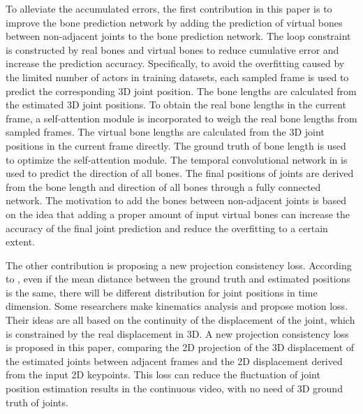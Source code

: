 \documentclass[journal]{IEEEtran}
\begin{document}
To alleviate the accumulated errors, the first contribution in this paper is to improve the bone prediction network by adding the prediction of virtual bones between non-adjacent joints to the bone prediction network. The loop constraint is constructed by real bones and virtual bones to reduce cumulative error and increase the prediction accuracy. Specifically, to avoid the overfitting caused by the limited number of actors in training datasets, each sampled frame is used to predict the corresponding 3D joint position. The bone lengths are calculated from the estimated 3D joint positions. To obtain the real bone lengths in the current frame, a self-attention module is incorporated to weigh the real bone lengths from sampled frames. The virtual bone lengths are calculated from the 3D joint positions in the current frame directly. The ground truth of bone length is used to optimize the self-attention module. The temporal convolutional network in \cite{20183D} is used to predict the direction of all bones. The final positions of joints are derived from the bone length and direction of all bones through a fully connected network. The motivation to add the bones between non-adjacent joints is based on the idea that adding a proper amount of input virtual bones can increase the accuracy of the final joint prediction and reduce the overfitting to a certain extent.



The other contribution is proposing a new projection consistency loss. According to  \cite{wang2020motion}, even if the  mean distance between the ground truth and estimated positions is the same, there will be different distribution for joint positions in time dimension. Some researchers \cite{2020Deep,wang2020motion} make kinematics analysis and propose motion loss. Their ideas are all based on the continuity of the displacement of the joint, which is constrained by the real displacement in 3D. A new projection consistency loss is proposed in this paper, comparing the 2D projection of the 3D displacement of the estimated joints between adjacent frames and the 2D displacement derived from the input 2D keypoints. This loss can reduce the fluctuation of joint position estimation results in the continuous video, with no need of 3D ground truth of joints.
\end{document}
